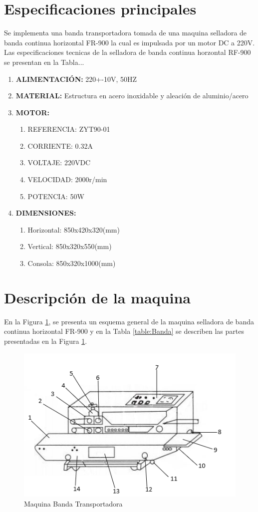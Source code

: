 	\section{Especificaciones principales}
		Se implementa una banda transportadora tomada de una maquina selladora de banda continua horizontal FR-900 la cual es impulsada por un motor DC a 220V.
		Las especificaciones tecnicas de la selladora de banda continua horzontal RF-900 se presentan en la Tabla...
		\begin{enumerate}
			\item\textbf{ALIMENTACIÓN:} 220+-10V, 50HZ
			\item\textbf{MATERIAL:} Estructura en acero inoxidable y aleación de aluminio/acero
			\item \textbf{MOTOR:}
				\begin{enumerate}
					\item{REFERENCIA:} ZYT90-01
					\item{CORRIENTE:} 0.32A
					\item{VOLTAJE:} 220VDC
					\item{VELOCIDAD:} 2000r/min
					\item{POTENCIA:} 50W				
				\end{enumerate}
			\item \textbf{DIMENSIONES:}
				\begin{enumerate}
					\item Horizontal: 850x420x320(mm)
					\item Vertical: 850x320x550(mm)
					\item Consola: 850x320x1000(mm)
				\end{enumerate}
		\end{enumerate}
	
\newpage
	\section{Descripción de la maquina}
		En la Figura \ref{fig:Banda}, se presenta un esquema general de la maquina selladora de banda continua horizontal FR-900 y en la Tabla \ref{table:Banda} se describen las partes presentadas en la Figura \ref{fig:Banda}.
			\begin{figure}[ht]
			\centering
			\includegraphics[scale=0.95]{Figs/65.png}
			\caption{Maquina Banda Transportadora}
			\label{fig:Banda}
		\end{figure}
	
